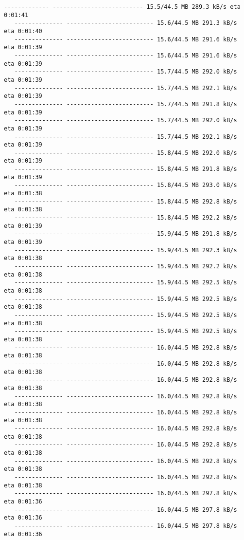 \documentclass[11pt]{article}
\begin{document}
\begin{Verbatim}[commandchars=\\\{\}]
   ------------- -------------------------- 15.5/44.5 MB 289.3 kB/s eta 0:01:41
   -------------- ------------------------- 15.6/44.5 MB 291.3 kB/s eta 0:01:40
   -------------- ------------------------- 15.6/44.5 MB 291.6 kB/s eta 0:01:39
   -------------- ------------------------- 15.6/44.5 MB 291.6 kB/s eta 0:01:39
   -------------- ------------------------- 15.7/44.5 MB 292.0 kB/s eta 0:01:39
   -------------- ------------------------- 15.7/44.5 MB 292.1 kB/s eta 0:01:39
   -------------- ------------------------- 15.7/44.5 MB 291.8 kB/s eta 0:01:39
   -------------- ------------------------- 15.7/44.5 MB 292.0 kB/s eta 0:01:39
   -------------- ------------------------- 15.7/44.5 MB 292.1 kB/s eta 0:01:39
   -------------- ------------------------- 15.8/44.5 MB 292.0 kB/s eta 0:01:39
   -------------- ------------------------- 15.8/44.5 MB 291.8 kB/s eta 0:01:39
   -------------- ------------------------- 15.8/44.5 MB 293.0 kB/s eta 0:01:38
   -------------- ------------------------- 15.8/44.5 MB 292.8 kB/s eta 0:01:38
   -------------- ------------------------- 15.8/44.5 MB 292.2 kB/s eta 0:01:39
   -------------- ------------------------- 15.9/44.5 MB 291.8 kB/s eta 0:01:39
   -------------- ------------------------- 15.9/44.5 MB 292.3 kB/s eta 0:01:38
   -------------- ------------------------- 15.9/44.5 MB 292.2 kB/s eta 0:01:38
   -------------- ------------------------- 15.9/44.5 MB 292.5 kB/s eta 0:01:38
   -------------- ------------------------- 15.9/44.5 MB 292.5 kB/s eta 0:01:38
   -------------- ------------------------- 15.9/44.5 MB 292.5 kB/s eta 0:01:38
   -------------- ------------------------- 15.9/44.5 MB 292.5 kB/s eta 0:01:38
   -------------- ------------------------- 16.0/44.5 MB 292.8 kB/s eta 0:01:38
   -------------- ------------------------- 16.0/44.5 MB 292.8 kB/s eta 0:01:38
   -------------- ------------------------- 16.0/44.5 MB 292.8 kB/s eta 0:01:38
   -------------- ------------------------- 16.0/44.5 MB 292.8 kB/s eta 0:01:38
   -------------- ------------------------- 16.0/44.5 MB 292.8 kB/s eta 0:01:38
   -------------- ------------------------- 16.0/44.5 MB 292.8 kB/s eta 0:01:38
   -------------- ------------------------- 16.0/44.5 MB 292.8 kB/s eta 0:01:38
   -------------- ------------------------- 16.0/44.5 MB 292.8 kB/s eta 0:01:38
   -------------- ------------------------- 16.0/44.5 MB 292.8 kB/s eta 0:01:38
   -------------- ------------------------- 16.0/44.5 MB 297.8 kB/s eta 0:01:36
   -------------- ------------------------- 16.0/44.5 MB 297.8 kB/s eta 0:01:36
   -------------- ------------------------- 16.0/44.5 MB 297.8 kB/s eta 0:01:36

\end{Verbatim}
\end{document}
